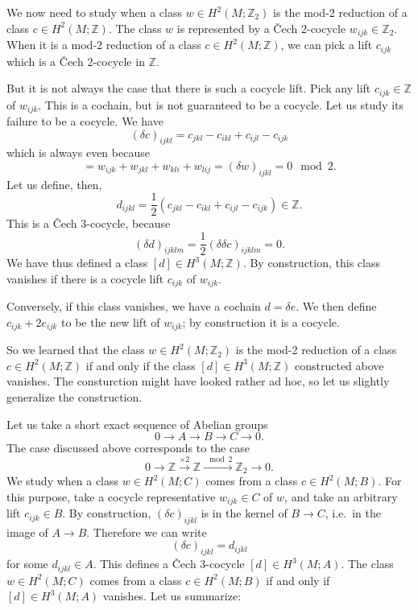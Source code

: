 \documentclass[12pt]{article}
\numberwithin{equation}{section}
\numberwithin{figure}{section}
\theoremstyle{remark}
\def\bZ{\mathbb{Z}}
\begin{document}
We now need to study when a class $w\in H^2(M;\bZ_2)$ is the mod-2 reduction of a class $c\in H^2(M;\bZ)$.
The class $w$ is represented by a \v Cech 2-cocycle $w_{ijk}\in \bZ_2$.
When it is a mod-2 reduction of a class $c\in H^2(M;\bZ)$,
we can pick a lift $c_{ijk}$ which is a \v Cech 2-cocycle in $\bZ$.

But it is not always the case that there is such a cocycle lift.
Pick any lift $c_{ijk}\in \bZ$ of $w_{ijk}$.
This is a cochain, but is not guaranteed to be a cocycle.
Let us study its failure to be a cocycle.
We have \begin{equation}
(\delta c)_{ijkl} = c_{jkl}-c_{ikl}+c_{ijl}-c_{ijk} 
\end{equation} which is always even because \begin{equation}
  = w_{ijk}+w_{jkl}+w_{kli}+w_{lij} = (\delta w)_{ijkl}=0\mod 2.
\end{equation}
Let us define, then, \begin{equation}
  d_{ijkl} = \frac12(c_{jkl}-c_{ikl}+c_{ijl}-c_{ijk})\in \bZ.
\end{equation}
This is a \v Cech 3-cocycle, because \begin{equation}
(\delta d)_{ijklm} = \frac12 (\delta\delta c)_{ijklm} =0.
\end{equation}
We have thus defined a class $[d]\in H^3(M;\bZ)$.
By construction, this class vanishes if there is a cocycle lift $c_{ijk}$ of $w_{ijk}$.

Conversely, if this class vanishes, we have a cochain $d=\delta e$.
We then define $c_{ijk}+2e_{ijk}$ to be the new lift of $w_{ijk}$;
by construction it is a cocycle.

So we learned that the class $w\in H^2(M;\bZ_2)$ is the mod-2 reduction of a class $c\in H^2(M;\bZ)$ 
if and only if the class $[d]\in H^3(M;\bZ)$ constructed above vanishes.
The consturction might have looked rather ad hoc, 
so let us slightly generalize the construction.

Let us take a short exact sequence of Abelian groups \begin{equation}
  0\to A\to B\to C\to 0.
\end{equation}
The case discussed above corresponds to the case \begin{equation}
  0\to \bZ\xrightarrow{\times2} \bZ\xrightarrow{\mod2} \bZ_2\to 0.
\end{equation}
We study when a class $w\in H^2(M;C)$ comes from a class $c\in H^2(M;B)$.
For this purpose, take a cocycle representative $w_{ijk}\in C$ of $w$,
and take an arbitrary lift $c_{ijk}\in B$.
By construction, $(\delta c)_{ijkl}$ is in the kernel of $B\to C$,
i.e.~in the image of $A\to B$.
Therefore we can write \begin{equation}
  (\delta c)_{ijkl} = d_{ijkl}
\end{equation} for some $d_{ijkl}\in A$.
This defines a \v Cech 3-cocycle $[d]\in H^3(M;A)$.
The class $w\in H^2(M;C)$ comes from a class $c\in H^2(M;B)$ if and only if $[d]\in H^3(M;A)$ vanishes.
Let us summarize:
\end{document}
